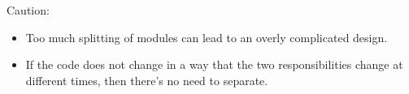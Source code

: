 \documentclass[xcolor=svgnames]{beamer}
\begin{document}

\begin{frame}{\subsecname}

    \begin{minipage}{\columnwidth}
    \end{minipage}

\end{frame}


\begin{frame}{\subsecname}

    \begin{minipage}{\columnwidth}
    \end{minipage}

\end{frame}


\begin{frame}{\subsecname}

    \begin{minipage}{\columnwidth}
    \end{minipage}

\end{frame}


\begin{frame}{\subsecname}

    \begin{minipage}{\columnwidth}
    \end{minipage}

\end{frame}


\begin{frame}{\subsecname}
    Caution:
    \begin{itemize}
        \pause \item Too much splitting of modules can lead to an overly
            complicated design.
        \pause \item If the code does not change in a way that the two
            responsibilities change at different times, then there's no need to
            separate.
    \end{itemize}
\end{frame}
\end{document}
